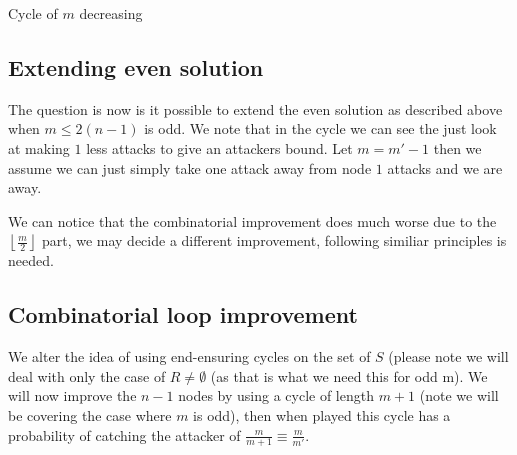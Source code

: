 \documentclass[a4paper,10pt]{article}
\newcommand{\floor}[1]{\left \lfloor #1 \right \rfloor}
\theoremstyle{definition}
\theoremstyle{definition}
\theoremstyle{remark}
\theoremstyle{definition}
\begin{document}
\begin{myfigure}
\begin{center}
\end{center}
\caption{Cycle of $m$ decreasing}
\end{myfigure}


\subsection{Extending even solution}
The question is now is it possible to extend the even solution as described above when $m \leq 2(n-1)$ is odd. We note that in the cycle we can see the just look at making $1$ less attacks to give an attackers bound. Let $m=m'-1$ then we assume we can just simply take one attack away from node $1$ attacks and we are away.

We can notice that the combinatorial improvement does much worse due to the $\floor{\frac{m}{2}}$ part, we may decide a different improvement, following similiar principles is needed.

\subsection{Combinatorial loop improvement}
We alter the idea of using end-ensuring cycles on the set of $S$ (please note we will deal with only the case of $R \neq \emptyset$ (as that is what we need this for odd m). We will now improve the $n-1$ nodes by using a cycle of length $m+1$ (note we will be covering the case where $m$ is odd), then when played this cycle has a probability of catching the attacker of $\frac{m}{m+1} \equiv \frac{m}{m'}$.
\end{document}
